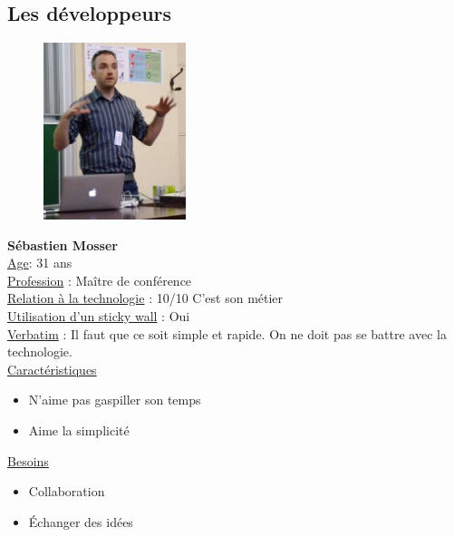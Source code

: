\documentclass{article}
\begin{document}
\subsection{Les développeurs}
\begin{figure}
  \vspace{-20pt}
  \begin{center}
    \includegraphics[width=0.37\textwidth]{Mosser}
  \end{center}
  \vspace{-20pt}
  \vspace{-10pt}
\end{figure}
\textbf{Sébastien Mosser}
\vspace{0.2cm}\\
\underline{Age}: 31 ans
\vspace{0.2cm}\\
\underline{Profession} : Maître de conférence
\vspace{0.2cm}\\
\underline{Relation à la technologie} : 10/10 C'est son métier
\vspace{0.2cm}\\
\underline{Utilisation d'un sticky wall} : Oui
\vspace{0.2cm}\\
\underline{Verbatim} : Il faut que ce soit simple et rapide. On ne doit pas se battre avec la technologie.
\vspace{0.2cm}\\
\underline{Caractéristiques}
\begin{itemize}
  \item N'aime pas gaspiller son temps
  \item Aime la simplicité
\end{itemize}
\vspace{0.2cm}
\underline{Besoins}
\begin{itemize}
  \item Collaboration
  \item Échanger des idées
\end{itemize}
\hfill\\
\vspace{-1cm}\\
\end{document}
